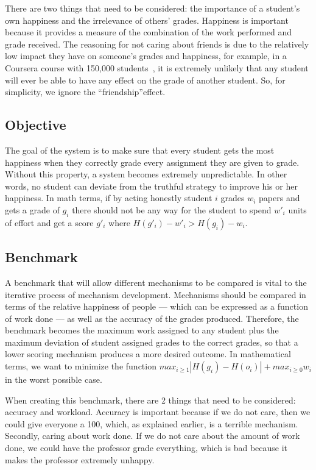 \documentclass[12pt, Arial]{article}
\begin{document}
There are two things that need to be considered: the importance of a student's own happiness and the irrelevance of others' grades. Happiness is important because it provides a measure of the combination of the work performed and grade received. The reasoning for not caring about friends is due to the relatively low impact they have on someone's grades and happiness, for example, in a Coursera course with 150,000 students~\cite{swotanalysisofmoocs}, it is extremely unlikely that any student will ever be able to have any effect on the grade of another student. So, for simplicity, we ignore the ``friendship''effect.

\subsection{Objective}
The goal of the system is to make sure that every student gets the most happiness when they correctly grade every assignment they are given to grade. Without this property, a system becomes extremely unpredictable. In other words, no student can deviate from the truthful strategy to improve his or her happiness. In math terms, if by acting honestly student $i$ grades $w_i$ papers and gets a grade of $g_i$ there should not be any way for the student to spend $w'_i$ units of effort and get a score $g'_i$ where $H(g'_i)-w'_i > H(g_i)-w_i$.

\subsection{Benchmark}
A benchmark that will allow different mechanisms to be compared is vital to the iterative process of mechanism development. Mechanisms should be compared in terms of the relative happiness of people --- which can be expressed as a function of work done --- as well as the accuracy of the grades produced. Therefore, the benchmark becomes the maximum work assigned to any student plus the maximum deviation of student assigned grades to the correct grades, so that a lower scoring mechanism produces a more desired outcome. In mathematical terms, we want to minimize the function $max_{i \ge 1} |H(g_i)-H(o_i)| + max_{i \ge 0} w_i$ in the worst possible case.

When creating this benchmark, there are 2 things that need to be considered: accuracy and workload. Accuracy is important because if we do not care, then we could give everyone a 100, which, as explained earlier, is a terrible mechanism. Secondly, caring about work done. If we do not care about the amount of work done, we could have the professor grade everything, which is bad because it makes the professor extremely unhappy. 
\end{document}
